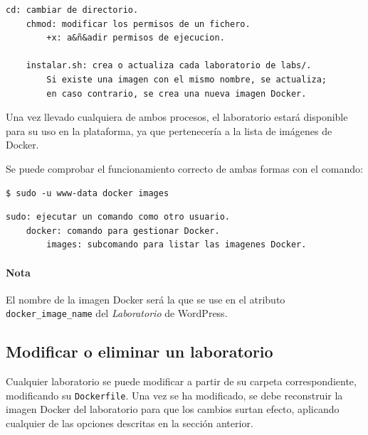                \begin{lstlisting}[style=comment_style]
    cd: cambiar de directorio.
    chmod: modificar los permisos de un fichero.
        +x: a&ñ&adir permisos de ejecucion.

    instalar.sh: crea o actualiza cada laboratorio de labs/.
        Si existe una imagen con el mismo nombre, se actualiza;
        en caso contrario, se crea una nueva imagen Docker.
                \end{lstlisting}

                Una vez llevado cualquiera de ambos procesos, el laboratorio estará disponible para su uso en la plataforma, ya que pertenecería a la lista de imágenes de Docker.

                Se puede comprobar el funcionamiento correcto de ambas formas con el comando:
                \\

                \begin{lstlisting}[style=bash_style]
    $ sudo -u www-data docker images
                \end{lstlisting}

                \begin{lstlisting}[style=comment_style]
    sudo: ejecutar un comando como otro usuario.
    docker: comando para gestionar Docker.
        images: subcomando para listar las imagenes Docker.
                \end{lstlisting}

                \paragraph{Nota}

                    El nombre de la imagen Docker será la que se use en el atributo \texttt{docker\_image\_name} del \textit{Laboratorio} de WordPress.

        \subsection{Modificar o eliminar un laboratorio}

            Cualquier laboratorio se puede modificar a partir de su carpeta correspondiente, modificando su \texttt{Dockerfile}. Una vez se ha modificado, se debe reconstruir la imagen Docker del laboratorio para que los cambios surtan efecto, aplicando cualquier de las opciones descritas en la sección anterior.

